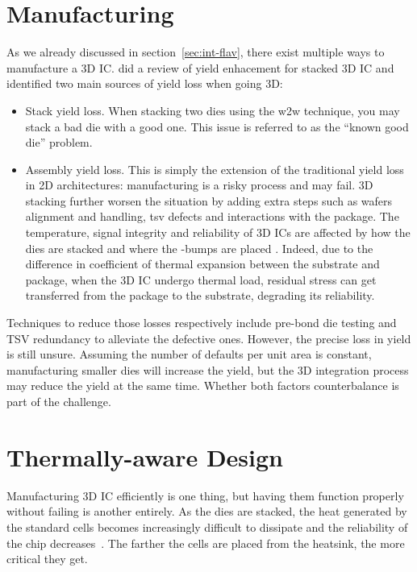 \documentclass[11pt,a4paper]{report} %
\theoremstyle{customdef}
\begin{document}
\section{Manufacturing}
As we already discussed in section~\ref{sec:int-flav}, there exist multiple ways to manufacture a 3D IC.
\citet{Xu2012} did a review of yield enhacement for stacked 3D IC and identified two main sources of yield loss when going 3D:
\begin{itemize}
	\item Stack yield loss.
	When stacking two dies using the \gls{w2w} technique, you may stack a bad die with a good one.
	This issue is referred to as the “known good die” problem.

	\item Assembly yield loss.
	This is simply the extension of the traditional yield loss in 2D architectures: manufacturing is a risky process and may fail.
	3D stacking further worsen the situation by adding extra steps such as wafers alignment and handling, \gls{tsv} defects and interactions with the package.
	The temperature, signal integrity and reliability of 3D ICs are affected by how the dies are stacked and where the \textmu-bumps are placed \citep{Vempati2009,Jung2012}.
	Indeed, due to the difference in coefficient of thermal expansion between the substrate and package, when the 3D IC undergo thermal load, residual stress can get transferred from the package to the substrate, degrading its reliability.
\end{itemize}

Techniques to reduce those losses respectively include pre-bond die testing and TSV redundancy to alleviate the defective ones.
However, the precise loss in yield is still unsure.
Assuming the number of defaults per unit area is constant, manufacturing smaller dies will increase the yield, but the 3D integration process may reduce the yield at the same time.
Whether both factors counterbalance is part of the challenge.



\section{Thermally-aware Design}
Manufacturing 3D IC efficiently is one thing, but having them function properly without failing is another entirely.
As the dies are stacked, the heat generated by the standard cells becomes increasingly difficult to dissipate and the reliability of the chip decreases~\citep{Lin2008}.
The farther the cells are placed from the heatsink, the more critical they get.
\end{document}
